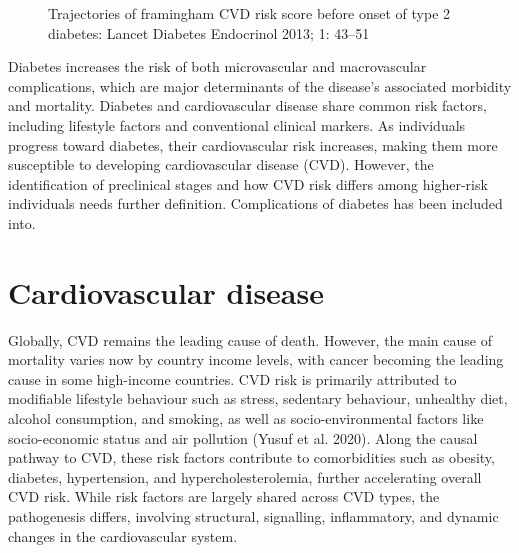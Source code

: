 \documentclass[
  a4paper,
  headsepline=true,
  open=any]{scrbook}
\begin{document}
\begin{figure}

\begin{minipage}[t]{\linewidth}

{\centering 


\caption{Trajectories of framingham CVD risk score before onset of type
2 diabetes: Lancet Diabetes Endocrinol 2013; 1: 43--51}

}

\end{minipage}%

\end{figure}

Diabetes increases the risk of both microvascular and macrovascular
complications, which are major determinants of the disease's associated
morbidity and mortality. Diabetes and cardiovascular disease share
common risk factors, including lifestyle factors and conventional
clinical markers. As individuals progress toward diabetes, their
cardiovascular risk increases, making them more susceptible to
developing cardiovascular disease (CVD). However, the identification of
preclinical stages and how CVD risk differs among higher-risk
individuals needs further definition. Complications of diabetes has been
included into.


\hypertarget{cardiovascular-disease}{%
\chapter{Cardiovascular disease}\label{cardiovascular-disease}}

Globally, CVD remains the leading cause of death. However, the main
cause of mortality varies now by country income levels, with cancer
becoming the leading cause in some high-income countries. CVD risk is
primarily attributed to modifiable lifestyle behaviour such as stress,
sedentary behaviour, unhealthy diet, alcohol consumption, and smoking,
as well as socio-environmental factors like socio-economic status and
air pollution (Yusuf et al. 2020). Along the causal pathway to CVD,
these risk factors contribute to comorbidities such as obesity,
diabetes, hypertension, and hypercholesterolemia, further accelerating
overall CVD risk. While risk factors are largely shared across CVD
types, the pathogenesis differs, involving structural, signalling,
inflammatory, and dynamic changes in the cardiovascular system.
\end{document}
